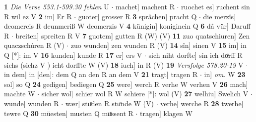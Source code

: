 \documentclass[8pt,a4paper,notitlepage]{article}
\begin{document}
\begin{table}[ht]
\begin{minipage}[t]{0.5\linewidth}
\textbf{1} \textit{Die Verse 553.1-599.30 fehlen} U   $\cdot$ machet] machent R  $\cdot$ ruochet es] ruchent sin R wil ez V \textbf{2} im] Er R  $\cdot$ guoter] grosser R \textbf{3} sprâchen] pracht Q  $\cdot$ die merzîs] deomercis R deunmeriß W deomerzis V \textbf{4} künigin] koniginein Q \textbf{6} dâ vür] Daruff R  $\cdot$ breiten] spreiten R V \textbf{7} guotem] gutten R (W) (V) \textbf{11} zuo quatschiuren] Zen quaczschúren R (V)  $\cdot$ zuo wunden] zen wunden R (V) \textbf{14} sîn] sinen V \textbf{15} im] in Q [*]: im V \textbf{16} kunden] kunde R \textbf{17} er] ers V  $\cdot$ sich niht dorfte] sin ich doͯrff R sichs (sichz V ) icht dorffte W (V) \textbf{18} iuch] in R (V) \textbf{19} \textit{Versfolge 578.20-19} V   $\cdot$ in dem] in [den]: dem Q an den R an dem V \textbf{21} tragt] tragen R  $\cdot$ in] \textit{om.} W \textbf{23} sol] so Q \textbf{24} gedigen] bediegen Q \textbf{25} were] werch R verhe W verhen V \textbf{26} mach] machte W  $\cdot$ sicher wol] schier wol R W schiere [*]: wol (V) \textbf{27} welhiu] Swelich V  $\cdot$ wunde] wunden R  $\cdot$ wær] stuͯden R stuͤnde W (V)  $\cdot$ verhe] werche R \textbf{28} twerhe] tewre Q \textbf{30} müesten] musten Q muͯssent R  $\cdot$ tragen] klagen W \newline
\end{minipage}
\end{table}
\end{document}
